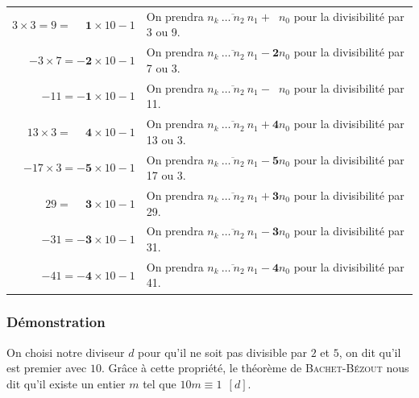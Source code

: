 \documentclass[a4paper, twoside]{article}
\begin{document}
	\begin{center}
	\begin{tabular}{rl}

		$3 \times 3 = 9 = \mathbf{\phantom{-}1} \times 10 - 1$ & On prendra $\overline{n_{k}~\dots~n_{2}~n_{1}}~\mathbf{+~\phantom{1}}n_{0}$ pour la divisibilité par 3 ou 9.\\
		$-3 \times 7 = \mathbf{-2} \times 10 - 1$ & On prendra $\overline{n_{k}~\dots~n_{2}~n_{1}}~\mathbf{-~2}n_{0}$ pour la divisibilité par 7 ou 3.\\
			$-11 = \mathbf{-1} \times 10 - 1$ & On prendra $\overline{n_{{k}}~\dots~n_{2}~n_{1}}~\mathbf{-~\phantom{1}}n_{0}$ pour la divisibilité par 11.\\
		$13 \times 3 = \mathbf{\phantom{-}4} \times 10 - 1$ & On prendra $\overline{n_{{k}}~\dots~n_{2}~n_{1}}~\mathbf{+~4}n_{0}$ pour la divisibilité par 13 ou 3.\\
		$-17 \times 3 = \mathbf{-5} \times 10 - 1$ & On prendra $\overline{n_{{k}}~\dots~n_{2}~n_{1}}~\mathbf{-~5}n_{0}$ pour la divisibilité par 17 ou 3.\\
			$29 = \mathbf{\phantom{-}3} \times 10 - 1$ & On prendra $\overline{n_{{k}}~\dots~n_{2}~n_{1}}~\mathbf{+~3}n_{0}$ pour la divisibilité par 29.\\
			$-31 = \mathbf{-3} \times 10 - 1$ & On prendra $\overline{n_{{k}}~\dots~n_{2}~n_{1}}~\mathbf{-~3}n_{0}$ pour la divisibilité par 31.\\
			$-41 = \mathbf{-4} \times 10 - 1$ & On prendra $\overline{n_{{k}}~\dots~n_{2}~n_{1}}~\mathbf{-~4}n_{0}$ pour la divisibilité par 41.\\

	\end{tabular}
	\end{center}

	\vfill

	\subsubsection*{Démonstration}

		On choisi notre diviseur $d$ pour qu'il ne soit pas divisible par $2$ et $5$, on dit qu'il est premier avec $10$. Grâce à cette propriété, le théorème de \textsc{Bachet-Bézout} nous dit qu'il existe un entier $m$ tel que $10m \equiv 1 ~~ [d]$.\\

	\vspace{-5 mm}
\end{document}
